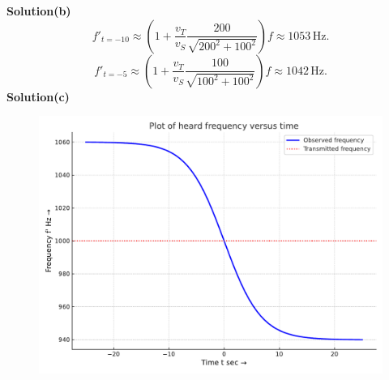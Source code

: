 \documentclass[12pt,a4paper]{article}
\begin{document}
\textbf{Solution(b)}
\[f'_{t=-10}\approx\left(1+\frac{v_T}{v_S}\frac{200}{\sqrt{200^2+100^2}}\right)f\approx1053\,\text{Hz}.\]
\[f'_{t=-5}\approx\left(1+\frac{v_T}{v_S}\frac{100}{\sqrt{100^2+100^2}}\right)f\approx1042\,\text{Hz}.\]
\textbf{Solution(c)}
\begin{figure}[h]
    \centering
    \includegraphics[width=1\linewidth]{figs/fig_sol_7.5c.pdf}
\end{figure}
\end{document}

